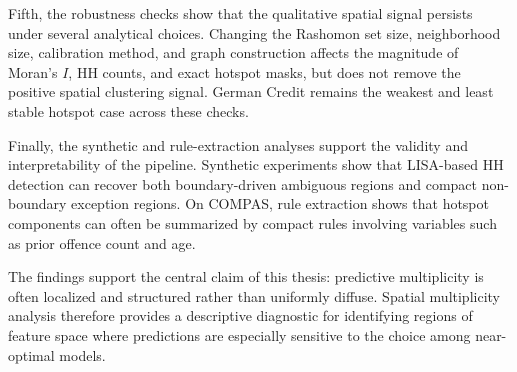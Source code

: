 Fifth, the robustness checks show that the qualitative spatial signal persists under several
analytical choices. Changing the Rashomon set size, neighborhood size, calibration method,
and graph construction affects the magnitude of Moran's \(I\), HH counts, and exact
hotspot masks, but does not remove the positive spatial clustering signal. German Credit
remains the weakest and least stable hotspot case across these checks.

Finally, the synthetic and rule-extraction analyses support the validity and interpretability
of the pipeline. Synthetic experiments show that LISA-based HH detection can recover
both boundary-driven ambiguous regions and compact non-boundary exception regions.
On COMPAS, rule extraction shows that hotspot components can often be summarized by
compact rules involving variables such as prior offence count and age.

The findings support the central claim of this thesis: predictive multiplicity is often
localized and structured rather than uniformly diffuse. Spatial multiplicity analysis
therefore provides a descriptive diagnostic for identifying regions of feature space where
predictions are especially sensitive to the choice among near-optimal models.